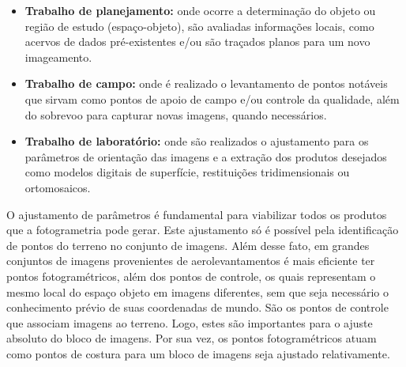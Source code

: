 \begin{itemize}

    \item \textbf{Trabalho de planejamento:} onde ocorre a determinação do objeto ou região de estudo (espaço-objeto), são avaliadas informações locais, como acervos de dados pré-existentes e/ou são traçados planos para um novo imageamento.
    \item \textbf{Trabalho de campo:} onde é realizado o levantamento de pontos notáveis que sirvam como pontos de apoio de campo e/ou controle da qualidade, além do sobrevoo para capturar novas imagens, quando necessários.
    \item \textbf{Trabalho de laboratório:} onde são realizados o ajustamento para os parâmetros de orientação das imagens e a extração dos produtos desejados como modelos digitais de superfície, restituições tridimensionais ou ortomosaicos.
    
\end{itemize}

O ajustamento de parâmetros é fundamental para viabilizar todos os produtos que a fotogrametria pode gerar. Este ajustamento só é possível pela identificação de pontos do terreno no conjunto de imagens. Além desse fato, em grandes conjuntos de imagens provenientes de aerolevantamentos é mais eficiente ter pontos fotogramétricos, além dos pontos de controle, os quais representam o mesmo local do espaço objeto em imagens diferentes, sem que seja necessário o conhecimento prévio de suas coordenadas de mundo. São os pontos de controle que associam imagens ao terreno. Logo, estes são importantes para o ajuste absoluto do bloco de imagens. Por sua vez, os pontos fotogramétricos atuam como pontos de costura para um bloco de imagens seja ajustado relativamente.

